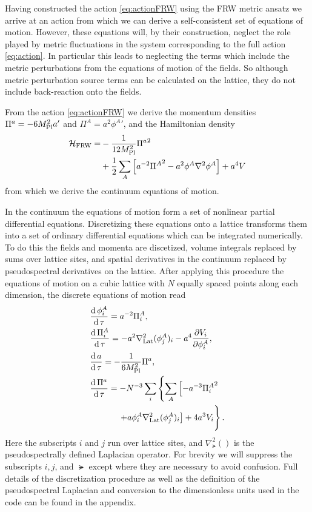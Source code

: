 Having constructed the action \eqref{eq:actionFRW} using the FRW metric ansatz we arrive at an action from which we can derive a self-consistent set of equations of motion. However, these equations will, by their construction, neglect the role played by metric fluctuations in the system corresponding to the full action \eqref{eq:action}. 
In particular this leads to neglecting the terms which include the metric perturbations from the equations of motion of the fields. So although metric perturbation source terms can be calculated on the lattice, they do not include back-reaction onto the fields.

From the action \eqref{eq:actionFRW} we derive the momentum densities $\Pi^a=-6M_{\mathrm{Pl}}^2a'$ and $\Pi^A=a^2{\phi^A}'$, and the Hamiltonian density
\begin{align} \label{eq:hamFRW}
  \begin{split}
    \mathcal{H}_\mathrm{FRW} = &-\frac{1}{12M_{\mathrm{Pl}}^2}{\Pi^a}^2 \\
    &+ \frac{1}{2}\sum_A\left[ a^{-2}{\Pi^A}^2 -a^2\phi^A\nabla^2\phi^A \right] +a^4V
    \end{split}
\end{align}
from which we derive the continuum equations of motion.

In the continuum the equations of motion form a set of nonlinear partial differential equations. Discretizing these equations onto a lattice transforms them into a set of ordinary differential equations which can be integrated numerically. To do this the fields and momenta are discetized, volume integrals replaced by sums over lattice sites, and spatial derivatives in the continuum replaced by pseudospectral derivatives on the lattice. After applying this procedure the equations of motion on a cubic lattice with $N$ equally spaced points along each dimension, the discrete equations of motion read
\begin{align}
  & \frac{\dd\phi^A_i}{\dd\tau} = a^{-2}\Pi^A_i,  \label{eq:lat eom a}\\
  & \frac{\dd\Pi^A_i}{\dd\tau} = -a^2\nabla^2_\lat(\phi^A_j)_i -a^4\frac{\partial V_i}{\partial \phi^A_i},  \label{eq:lat eom pi phi}\\
  & \frac{\dd a}{\dd\tau} = -\frac{1}{6\mpl^2}\Pi^a,  \label{eq:lat eom phi} \\
  & \frac{\dd\Pi^a}{\dd\tau} = -N^{-3}\sum_i\left\{ \sum_A\left[-a^{-3}{\Pi^A_i}^2 \right.\right. \nonumber \\
    & \hphantom{\frac{\dd\Pi^a}{\dd\tau} = } \left.\left. + a\phi^A_i\nabla^2_\lat(\phi^A_j)_i \right] + 4a^3V_i\vphantom{\sum_A}\right\}. \label{eq:lat eom pi a}  
\end{align}
Here the subscripts $i$ and $j$ run over lattice sites, and $\nabla^2_\lat()$ is the pseudospectrally defined Laplacian operator.
For brevity we will suppress the subscripts $i,j$, and $\lat$ except where they are necessary to avoid confusion.
Full details of the discretization procedure as well as the definition of the pseudospectral Laplacian and conversion to the dimensionless units used in the code can be found in the appendix.

